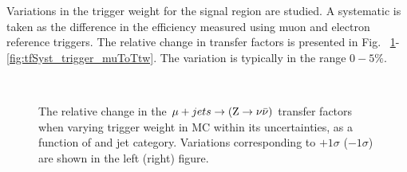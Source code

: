Variations in the trigger weight for the signal region are studied. A systematic is taken
as the difference in the efficiency measured using muon and electron reference triggers.
The relative change in transfer factors is presented in Fig.
~\ref{fig:tfSyst_trigger_muToZinv}-\ref{fig:tfSyst_trigger_muToTtw}. The
variation is typically in the range $0-5\%$.

\begin{figure}[!h]
  \centering
   ~~
  \\

  \caption{\label{fig:tfSyst_trigger_muToZinv} The relative change in
  the $\mu + jets \rightarrow ({\text Z} \rightarrow \nu\bar{\nu})$ transfer
  factors when varying trigger weight in MC within its uncertainties, as a function of \scalht and jet category. 
  Variations corresponding to $+1\sigma$ ($-1\sigma$) are shown in the left (right) figure. 
  }
\end{figure}
